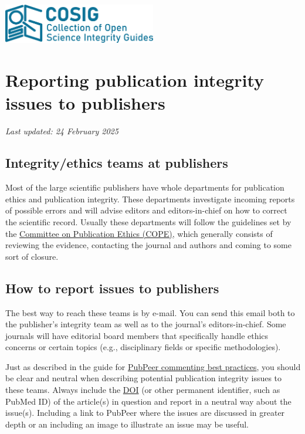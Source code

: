 \documentclass[letterpaper, 12pt]{article}
\begin{document}
\flushleft
\includegraphics[width=0.5\textwidth]{img/home/241017_final_logo_mockup.png}

\section*{Reporting publication integrity issues to publishers}
\textit{Last updated: 24 February 2025}

\subsection*{Integrity/ethics teams at publishers}

Most of the large scientific publishers have whole departments for publication ethics and publication integrity. These departments investigate incoming reports of possible errors and will advise editors and editors-in-chief on how to correct the scientific record. Usually these departments will follow the guidelines set by the \href{https://publicationethics.org/}{Committee on Publication Ethics (COPE)}, which generally consists of reviewing the evidence, contacting the journal and authors and coming to some sort of closure.

\subsection*{How to report issues to publishers}

The best way to reach these teams is by e-mail. You can send this email both to the publisher's integrity team as well as to the journal's editors-in-chief. Some journals will have editorial board members that specifically handle ethics concerns or certain topics (e.g., disciplinary fields or specific methodologies).

Just as described in the guide for \href{https://osf.io/sghaq}{PubPeer commenting best practices}, you should be clear and neutral when describing potential publication integrity issues to these teams. Always include the \href{https://www.doi.org/}{DOI} (or other permanent identifier, such as PubMed ID) of the article(s) in question and report in a neutral way about the issue(s). Including a link to PubPeer where the issues are discussed in greater depth or an including an image to illustrate an issue may be useful.
\end{document}
